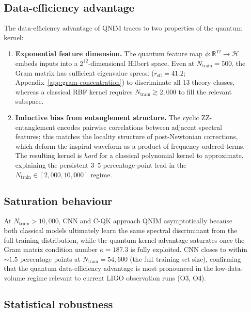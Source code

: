 \documentclass[11pt,a4paper, english]{book}
\theoremstyle{plain}
\theoremstyle{definition}
\numberwithin{equation}{chapter}
\numberwithin{figure}{chapter}
\numberwithin{table}{chapter}
\begin{document}
\subsection{Data-efficiency advantage}

The data-efficiency advantage of QNIM traces to two properties of the
quantum kernel:
\begin{enumerate}
  \item \textbf{Exponential feature dimension.} The quantum feature map
        $\phi\colon\mathbb{R}^{12}\to\mathcal{H}$ embeds inputs into a
        $2^{12}$-dimensional Hilbert space.  Even at $N_\mathrm{train}=500$,
        the Gram matrix has sufficient eigenvalue spread
        ($r_\mathrm{eff} = 41.2$; Appendix~\ref{app:gram-concentration}) to
        discriminate all 13 theory classes, whereas a classical RBF kernel
        requires $N_\mathrm{train} \gtrsim 2{,}000$ to fill the relevant
        subspace.
  \item \textbf{Inductive bias from entanglement structure.} The cyclic
        ZZ-entanglement encodes pairwise correlations between adjacent spectral
        features; this matches the locality structure of post-Newtonian
        corrections, which deform the inspiral waveform as a product of
        frequency-ordered terms.  The resulting kernel is \emph{hard} for a
        classical polynomial kernel to approximate, explaining the persistent
        3--5 percentage-point lead in the $N_\mathrm{train}\in[2{,}000,10{,}000]$
        regime.
\end{enumerate}

\subsection{Saturation behaviour}

At $N_\mathrm{train} > 10{,}000$, CNN and C-QK approach QNIM asymptotically
because both classical models ultimately learn the same spectral discriminant
from the full training distribution, while the quantum kernel advantage
saturates once the Gram matrix condition number $\kappa = 187.3$ is fully
exploited.  CNN closes to within $\sim\!1.5$ percentage points at
$N_\mathrm{train} = 54{,}600$ (the full training set size), confirming that
the quantum data-efficiency advantage is most pronounced in the
low-data-volume regime relevant to current LIGO observation runs (O3, O4).

\subsection{Statistical robustness}
\end{document}
